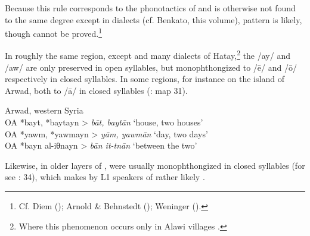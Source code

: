 \documentclass[output=paper]{langsci/langscibook}
\begin{document}
Because this rule corresponds to the phonotactics of  and is otherwise not found to the same degree except in  dialects (cf. Benkato, this volume), pattern  is likely, though cannot be proved.\footnote{Cf. Diem (\citeyear[47]{Diem1979}); Arnold \& Behnstedt (\citeyear[69--71]{ArnoldBehnstedt1993}); Weninger (\citeyear[748]{Weninger2011Aramaic}).}

In roughly the same region, except  and many dialects of Hatay,\footnote{Where this phenomenon occurs only in Alawi villages \citep[84]{Arnold1998}.} the  /ay/ and /aw/ are only preserved in open syllables, but monophthongized to /ē/ and /ō/ respectively in closed syllables. In some regions, for instance on the island of Arwad, both   to /ā/ in closed syllables (\citealt{Behnstedt1997}: map 31). 

\ea 
{Arwad, western Syria \citep[278]{Procházka2013}} \\
    \textup{OA} *bayt, *baytayn > \textit{bāt, baytān} \textup{‘house, two houses’\\
OA} *yawm, *yawmayn >  \textit{yām, yawmān} \textup{‘day, two days’\\
OA} *bayn al-iθnayn > \textit{bān it-tnān} \textup{‘}\textup{between the two’}\\
\z

Likewise, in older layers of ,  were usually monophthongized in closed syllables (for  see \citealt{Nöldeke1904Semitic}: 34), which makes  by L1 speakers of  rather likely \citep[227]{Fleisch1974Kfar}.
\end{document}
